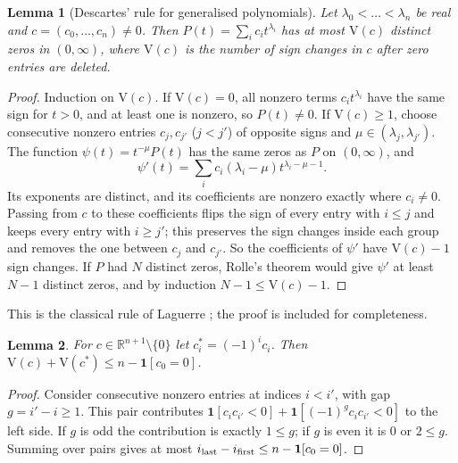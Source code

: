 \documentclass[11pt]{article}
\newtheorem{lemmaL}{Lemma}
\theoremstyle{remark}
\begin{document}
\begin{lemmaL}[Descartes' rule for generalised polynomials]\label{lem:B}
Let $\lambda_0<\dots<\lambda_n$ be real and $c=(c_0,\dots,c_n)\neq0$. Then $P(t)=\sum_ic_it^{\lambda_i}$ has at most $\mathrm V(c)$ distinct zeros in $(0,\infty)$, where $\mathrm V(c)$ is the number of sign changes in $c$ after zero entries are deleted.
\end{lemmaL}
\begin{proof}
Induction on $\mathrm V(c)$. If $\mathrm V(c)=0$, all nonzero terms $c_it^{\lambda_i}$ have the same sign for $t>0$, and at least one is nonzero, so $P(t)\ne0$. If $\mathrm V(c)\ge1$, choose consecutive nonzero entries $c_j,c_{j'}$ ($j<j'$) of opposite signs and $\mu\in(\lambda_j,\lambda_{j'})$. The function $\psi(t)=t^{-\mu}P(t)$ has the same zeros as $P$ on $(0,\infty)$, and
\[
\psi'(t)=\sum_ic_i(\lambda_i-\mu)t^{\lambda_i-\mu-1}.
\]
Its exponents are distinct, and its coefficients are nonzero exactly where $c_i\ne0$. Passing from $c$ to these coefficients flips the sign of every entry with $i\le j$ and keeps every entry with $i\ge j'$; this preserves the sign changes inside each group and removes the one between $c_j$ and $c_{j'}$. So the coefficients of $\psi'$ have $\mathrm V(c)-1$ sign changes. If $P$ had $N$ distinct zeros, Rolle's theorem would give $\psi'$ at least $N-1$ distinct zeros, and by induction $N-1\le\mathrm V(c)-1$.
\end{proof}
This is the classical rule of Laguerre \cite[Part~V, Ch.~1, Sec.~6]{PolyaSzego}; the proof is included for completeness.

\begin{lemmaL}\label{lem:C}
For $c\in\mathbb R^{n+1}\setminus\{0\}$ let $c^*_i=(-1)^ic_i$. Then $\mathrm V(c)+\mathrm V(c^*)\le n-\mathbf 1[c_0=0]$.
\end{lemmaL}
\begin{proof}
Consider consecutive nonzero entries at indices $i<i'$, with gap $g=i'-i\ge1$. This pair contributes $\mathbf 1[c_ic_{i'}<0]+\mathbf 1[(-1)^gc_ic_{i'}<0]$ to the left side. If $g$ is odd the contribution is exactly $1\le g$; if $g$ is even it is $0$ or $2\le g$. Summing over pairs gives at most $i_{\rm last}-i_{\rm first}\le n-\mathbf 1[c_0=0]$.
\end{proof}
\end{document}
